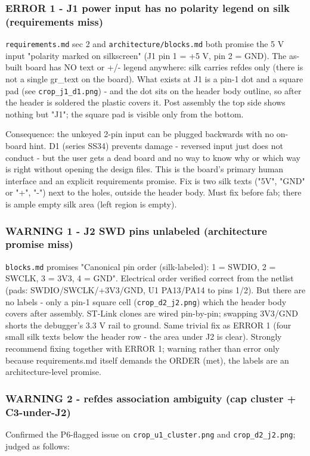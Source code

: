 \documentclass[11pt,a4paper]{article}
\begin{document}
\subsubsection*{ERROR 1 - J1 power input has no polarity legend on silk (requirements miss)}
\texttt{requirements.md} sec 2 and \texttt{architecture/blocks.md} both promise the 5 V input "polarity marked on silkscreen" (J1 pin 1 = +5 V, pin 2 = GND). The as-built board has NO text or +/- legend anywhere: silk carries refdes only (there is not a single gr\_text on the board). What exists at J1 is a pin-1 dot and a square pad (see \texttt{crop\_j1\_d1.png}) - and the dot sits on the header body outline, so after the header is soldered the plastic covers it. Post assembly the top side shows nothing but "J1"; the square pad is visible only from the bottom.

Consequence: the unkeyed 2-pin input can be plugged backwards with no on-board hint. D1 (series SS34) prevents damage - reversed input just does not conduct - but the user gets a dead board and no way to know why or which way is right without opening the design files. This is the board's primary human interface and an explicit requirements promise. Fix is two silk texts ("5V", "GND" or "+", "-") next to the holes, outside the header body. Must fix before fab; there is ample empty silk area (left region is empty).

\subsubsection*{WARNING 1 - J2 SWD pins unlabeled (architecture promise miss)}
\texttt{blocks.md} promises "Canonical pin order (silk-labeled): 1 = SWDIO, 2 = SWCLK, 3 = 3V3, 4 = GND". Electrical order verified correct from the netlist (pads: SWDIO/SWCLK/+3V3/GND, U1 PA13/PA14 to pins 1/2). But there are no labels - only a pin-1 square cell (\texttt{crop\_d2\_j2.png}) which the header body covers after assembly. ST-Link clones are wired pin-by-pin; swapping 3V3/GND shorts the debugger's 3.3 V rail to ground. Same trivial fix as ERROR 1 (four small silk texts below the header row - the area under J2 is clear). Strongly recommend fixing together with ERROR 1; warning rather than error only because requirements.md itself demands the ORDER (met), the labels are an architecture-level promise.

\subsubsection*{WARNING 2 - refdes association ambiguity (cap cluster + C3-under-J2)}
Confirmed the P6-flagged issue on \texttt{crop\_u1\_cluster.png} and \texttt{crop\_d2\_j2.png}; judged as follows:
\end{document}
